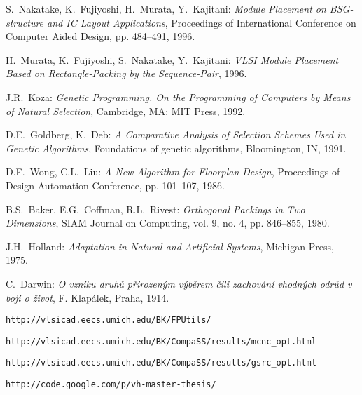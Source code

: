 \begin{thebibliography}{1}
{S.~Nakatake, K.~Fujiyoshi, H.~Murata, Y.~Kajitani:
{\em Module Placement on BSG-structure and IC Layout Applications},
Proceedings of International Conference on Computer Aided Design, pp. 484--491, 
1996.}

{H.~Murata, K.~Fujiyoshi, S.~Nakatake, Y.~Kajitani:
{\em VLSI Module Placement Based on Rectangle-Packing by the Sequence-Pair},
1996.}

{J.R.~Koza:
{\em Genetic Programming. On the Programming of Computers by Means of Natural Selection},
Cambridge, MA: MIT Press,
1992.}

{D.E.~Goldberg, K.~Deb:
{\em A Comparative Analysis of Selection Schemes Used in Genetic Algorithms},
Foundations of genetic algorithms, Bloomington, IN,
1991.}

{D.F.~Wong, C.L.~Liu:
{\em A New Algorithm for Floorplan Design},
Proceedings of Design Automation Conference, pp. 101--107,
1986.}

{B.S.~Baker, E.G.~Coffman, R.L.~Rivest:
{\em Orthogonal Packings in Two Dimensions},
SIAM Journal on Computing, vol. 9, no. 4, pp. 846--855,
1980.}

{J.H.~Holland:
{\em Adaptation in Natural and Artificial Systems},
Michigan Press, 
1975.}

{C.~Darwin:
{\em O vzniku druhů přirozeným výběrem čili zachování vhodných odrůd v boji o život},
F. Klapálek, Praha, 
1914.}

{\tt http://vlsicad.eecs.umich.edu/BK/FPUtils/}

{\tt http://vlsicad.eecs.umich.edu/BK/CompaSS/results/mcnc\_opt.html}

{\tt http://vlsicad.eecs.umich.edu/BK/CompaSS/results/gsrc\_opt.html}

{\tt http://code.google.com/p/vh-master-thesis/}

\end{thebibliography}
